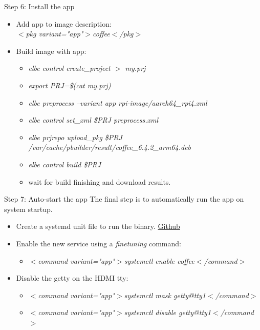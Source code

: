\documentclass{beamer}
\begin{document}
\begin{frame}{Step 6: Install the app}
	\begin{itemize}
		\item Add app to image description: \\
  			\emph{$<$pkg variant="app"$>$coffee$<$/pkg$>$}
		\item Build image with app:
		\small{\begin{itemize}
			\item \emph{elbe control create\_project $>$ my.prj}
			\item \emph{export PRJ=\$(cat my.prj)}
			\item \emph{elbe preprocess --variant app rpi-image/aarch64\_rpi4.xml}
			\item \emph{elbe control set\_xml \$PRJ preprocess.xml}
			\item \emph{elbe prjrepo upload\_pkg \$PRJ /var/cache/pbuilder/result/coffee\_6.4.2\_arm64.deb}
			\item \emph{elbe control build \$PRJ}
			\item wait for build finishing and download results.
		\end{itemize}}
	\end{itemize}
\end{frame}

\begin{frame}{Step 7: Auto-start the app}
	The final step is to automatically run the app on system startup.
	\begin{itemize}
		\item Create a systemd unit file to run the binary.
		\href{https://github.com/tomirgang/eh21_maintainable_linux/blob/main/examples/elbe_advanced/image/rpi-image/overlays/systemd/etc/systemd/system/coffee.service}{Github}
		\item Enable the new service using a \emph{finetuning} command:
		\begin{itemize}
			\item \emph{$<$command variant="app"$>$systemctl enable coffee$<$/command$>$}
		\end{itemize}
		\item Disable the getty on the HDMI tty:
		\begin{itemize}
			\item \emph{$<$command variant="app"$>$systemctl mask getty@tty1$<$/command$>$}
			\item \emph{$<$command variant="app"$>$systemctl disable getty@tty1$<$/command$>$}
		\end{itemize}
	\end{itemize}
\end{frame}
\end{document}
